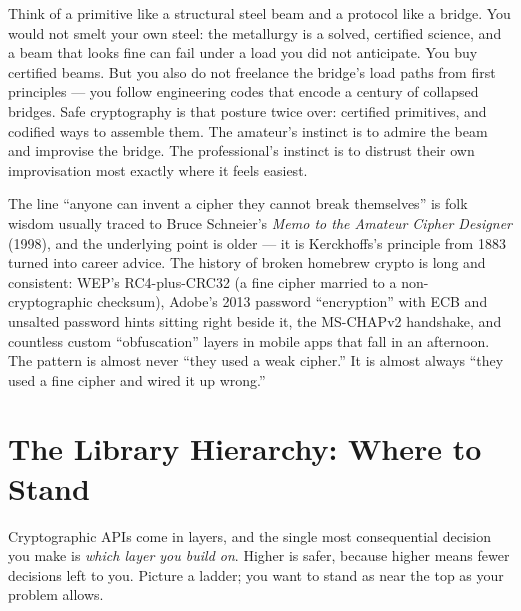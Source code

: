 \begin{intuitionbox}
Think of a primitive like a structural steel beam and a protocol like a bridge.
You would not smelt your own steel: the metallurgy is a solved, certified science,
and a beam that looks fine can fail under a load you did not anticipate. You buy
certified beams. But you also do not freelance the bridge's load paths from first
principles --- you follow engineering codes that encode a century of collapsed
bridges. Safe cryptography is that posture twice over: certified primitives, and
codified ways to assemble them. The amateur's instinct is to admire the beam and
improvise the bridge. The professional's instinct is to distrust their own
improvisation most exactly where it feels easiest.
\end{intuitionbox}

\begin{historybox}
The line ``anyone can invent a cipher they cannot break themselves'' is folk
wisdom usually traced to Bruce Schneier's \emph{Memo to the Amateur Cipher
Designer} (1998), and the underlying point is older --- it is Kerckhoffs's
principle from 1883 turned into career advice. The history of broken homebrew
crypto is long and consistent: WEP's RC4-plus-CRC32 (a fine cipher married to a
non-cryptographic checksum), Adobe's 2013 password ``encryption'' with ECB and
unsalted password hints sitting right beside it, the MS-CHAPv2 handshake, and
countless custom ``obfuscation'' layers in mobile apps that fall in an afternoon.
The pattern is almost never ``they used a weak cipher.'' It is almost always
``they used a fine cipher and wired it up wrong.''
\end{historybox}

\section{The Library Hierarchy: Where to Stand}
\label{ch39:hierarchy}

Cryptographic APIs come in layers, and the single most consequential decision you
make is \emph{which layer you build on}. Higher is safer, because higher means
fewer decisions left to you. Picture a ladder; you want to stand as near the top
as your problem allows.


